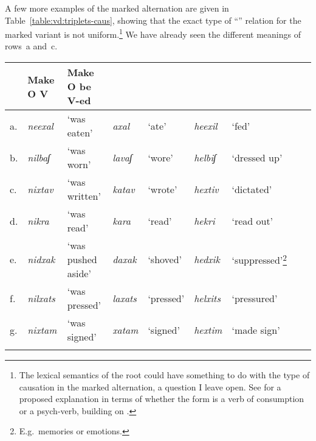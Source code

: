 \begin{exe}
\begin{xlist}
\begin{xlist}
\begin{exe}
\begin{exe}
\begin{xlist}
\begin{exe}
\begin{xlist}
\begin{exe}
\begin{xlist}
\begin{xlist}
\begin{exe}
\begin{xlist}
\begin{exe}
\begin{xlist}
\begin{exe}
\begin{xlist}
\begin{exe}
\begin{exe}
\begin{exe}
\begin{xlist}
\begin{exe}
\begin{exe}
\begin{xlist}
\begin{xlist}
\begin{exe}
\begin{xlist}
\begin{exe}
\begin{exe}
\begin{xlist}
\begin{exe}
\begin{exe}
\begin{xlist}
\begin{exe}
\begin{xlist}
\begin{exe}
\begin{xlist}
\begin{exe}
\begin{xlist}
\begin{exe}
\begin{exe}
\begin{xlist}
\begin{exe}
\begin{exe}
\begin{xlist}
\begin{xlist}
\begin{exe}
\begin{xlist}
\begin{xlist}
\begin{exe}
\begin{xlist}
\begin{exe}
\begin{xlist}
A few more examples of the marked alternation are given in Table~\ref{table:vd:triplets-caus}, showing that the exact type of ``'' relation for the marked variant is not uniform.\footnote{The lexical semantics of the root could have something to do with the type of causation in the marked alternation, a question I leave open. See \citet[44]{doron03} for a proposed explanation in terms of whether the {\tkal} form is a verb of consumption or a psych-verb, building on \cite{colesridhar77}.} We have already seen the different meanings of rows~a and~c.

\begin{sidewaystable}
	\begin{tabularx}{\textwidth}{lllllllcc}
    \lsptoprule
		\multicolumn{7}{c}{}		& Make O V	& Make O be V-ed\\\midrule
		 a.& \emph{neexal}	& `was eaten'	& \emph{axal} & `ate'		& \emph{heexil} & `fed'			& \cmark	& \xmark\\
		 b.& \emph{nilbaʃ}	& `was worn'	& \emph{lavaʃ} & `wore' 	& \emph{helbiʃ}	&	`dressed up' 	& \cmark	& \xmark\\\tablevspace
		 c.& \emph{nixtav} & `was written' & \emph{katav} & `wrote' & \emph{hextiv} & `dictated' & \xmark	& \cmark\\
		d.& \emph{nikra}	& `was read'	& \emph{kara} & `read'		& \emph{hekri}	& `read out'	& \xmark	& \cmark \\
		e.&	\emph{nidxak}	& `was pushed aside'	& \emph{daxak}	& `shoved'	& \emph{hedxik}	& `suppressed'\footnote{E.g.~memories or emotions.}	& \xmark	& \cmark\\
		f.& \emph{nilxats}	& `was pressed' &  \emph{laxats} & `pressed'	& \emph{helxits} & `pressured'	& \xmark	& \cmark \\\tablevspace
		 g.& \emph{nixtam}	& `was signed'	& \emph{xatam} & `signed'	& \emph{hextim}	& `made sign'	& \cmark	& \cmark\\\tablevspace

\end{tabularx}
\end{sidewaystable}
\end{xlist}
\end{exe}
\end{xlist}
\end{exe}
\end{xlist}
\end{xlist}
\end{exe}
\end{xlist}
\end{xlist}
\end{exe}
\end{exe}
\end{xlist}
\end{exe}
\end{exe}
\end{xlist}
\end{exe}
\end{xlist}
\end{exe}
\end{xlist}
\end{exe}
\end{xlist}
\end{exe}
\end{exe}
\end{xlist}
\end{exe}
\end{exe}
\end{xlist}
\end{exe}
\end{xlist}
\end{xlist}
\end{exe}
\end{exe}
\end{xlist}
\end{exe}
\end{exe}
\end{exe}
\end{xlist}
\end{exe}
\end{xlist}
\end{exe}
\end{xlist}
\end{exe}
\end{xlist}
\end{xlist}
\end{exe}
\end{xlist}
\end{exe}
\end{xlist}
\end{exe}
\end{exe}
\end{xlist}
\end{xlist}
\end{exe}
